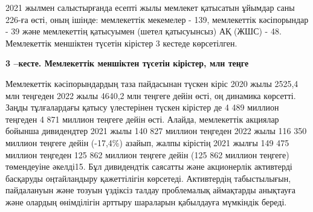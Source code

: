 {2021 жылмен салыстырғанда есепті жылы мемлекет қатысатын ұйымдар саны
226-ға өсті, оның ішінде: мемлекеттік мекемелер - 139, мемлекеттік
кәсіпорындар - 39 және мемлекеттің қатысуымен (шетел қатысуынсыз) АҚ
(ЖШС) - 48. Мемлекеттік меншіктен түсетін кірістер 3 кестеде
көрсетілген.

{\bfseries 3 --кесте. Мемлекеттік меншіктен түсетін кірістер, млн теңге}


Мемлекеттік кәсіпорындардың таза пайдасынан түскен кіріс 2020 жылы
2525,4 млн теңгеден 2022 жылы 4640,2 млн теңгеге дейін өсті, оң динамика
көрсетті. Заңды тұлғалардағы қатысу үлестерінен түскен кірістер де 4 489
миллион теңгеден 4 871 миллион теңгеге дейін өсті. Алайда, мемлекеттік
акциялар бойынша дивидендтер 2021 жылы 140 827 миллион теңгеден 2022
жылы 116 350 миллион теңгеге дейін (-17,4\%) азайып, жалпы кірістің 2021
жылғы 149 475 миллион теңгеден 125 862 миллион теңгеге дейін (125 862
миллион теңгеге) төмендеуіне әкелді15. Бұл дивидендтік саясатты және
акционерлік активтерді басқаруды оңтайландыру қажеттілігін көрсетеді.
Активтердің табыстылығын, пайдалануын және тозуын үздіксіз талдау
проблемалық аймақтарды анықтауға және олардың өнімділігін арттыру
шараларын қабылдауға мүмкіндік береді.

}
